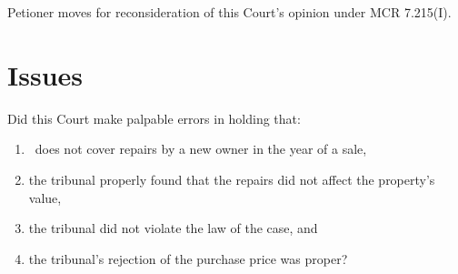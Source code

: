 \documentclass[12pt,\documentclassflag]{michiganCourtOfAppealsBrief}
\begin{document}



Petioner moves for reconsideration of this Court's opinion under MCR 7.215(I).

\section{Issues}

Did this Court make palpable errors in holding that:
\begin{enumerate}
\item \mathieuGast\ does not cover repairs by a new owner in the year of a sale,
\item the tribunal properly found that the repairs did not affect the property's value,
\item the tribunal did not violate the law of the case, and 
\item the tribunal's rejection of the purchase price was proper?
\end{enumerate}

  
 

  
\end{document}
